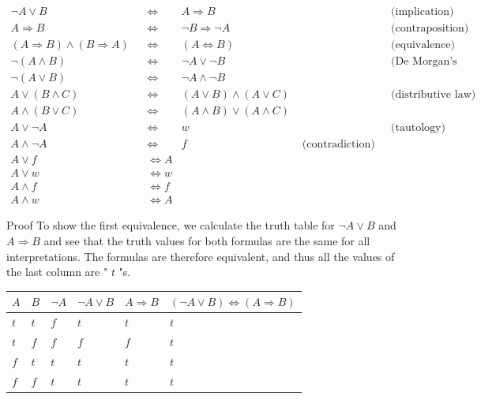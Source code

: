 \documentclass[10pt]{book}
\begin{document}
$$
\begin{array}{rlrlrl}
\neg A \vee B & & \Leftrightarrow & A \Rightarrow B & & \text { (implication) } \\
A \Rightarrow B & & \Leftrightarrow & \neg B \Rightarrow \neg A & & \text { (contraposition) } \\
(A \Rightarrow B) \wedge(B \Rightarrow A) & & \Leftrightarrow & (A \Leftrightarrow B) & & \text { (equivalence) } \\
\neg(A \wedge B) & & \Leftrightarrow & \neg A \vee \neg B & & \text { (De Morgan's law) } \\
\neg(A \vee B) & & \Leftrightarrow & \neg A \wedge \neg B & & \\
A \vee(B \wedge C) & & \Leftrightarrow & (A \vee B) \wedge(A \vee C) & & \text { (distributive law) } \\
A \wedge(B \vee C) & & \Leftrightarrow & (A \wedge B) \vee(A \wedge C) & & \\
A \vee \neg A & & \Leftrightarrow & w & & \text { (tautology) } \\
A \wedge \neg A & & \Leftrightarrow & f & \text { (contradiction) } \\
A \vee f & & \Leftrightarrow A & & \\
A \vee w & & \Leftrightarrow w & & \\
A \wedge f & & \Leftrightarrow f & & \\
A \wedge w & & \Leftrightarrow A & &
\end{array}
$$

Proof To show the first equivalence, we calculate the truth table for $\neg A \vee B$ and $A \Rightarrow B$ and see that the truth values for both formulas are the same for all interpretations. The formulas are therefore equivalent, and thus all the values of the last column are " $t$ "s.

\begin{center}
\begin{tabular}{llllll}
\hline
$A$ & $B$ & $\neg A$ & $\neg A \vee B$ & $A \Rightarrow B$ & $(\neg A \vee B) \Leftrightarrow(A \Rightarrow B)$ \\
\hline
$t$ & $t$ & $f$ & $t$ & $t$ & $t$ \\
\hline
$t$ & $f$ & $f$ & $f$ & $f$ & $t$ \\
\hline
$f$ & $t$ & $t$ & $t$ & $t$ & $t$ \\
\hline
$f$ & $f$ & $t$ & $t$ & $t$ & $t$ \\
\hline
\end{tabular}
\end{center}
\end{document}
